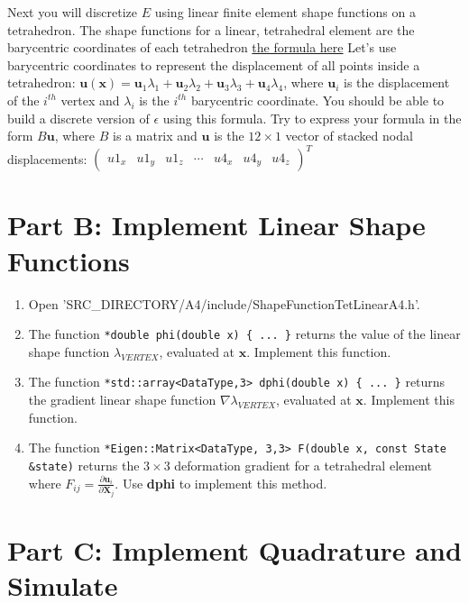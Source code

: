 \documentclass[11pt]{article}
\begin{document}
Next you will discretize $E$ using linear finite element shape functions on a tetrahedron. The shape functions for a linear, tetrahedral element are the barycentric coordinates of each tetrahedron \href{https://en.wikipedia.org/wiki/Barycentric_coordinate_system}{the formula here} Let's use barycentric coordinates to represent the displacement of all points inside a tetrahedron: $\mathbf{u(\mathbf{x})} = \mathbf{u}_1\lambda_1 +\mathbf{u}_2\lambda_2+\mathbf{u}_3\lambda_3+\mathbf{u}_4\lambda_4$, where $\mathbf{u}_i$ is the displacement of the $i^{th}$ vertex and $\lambda_i$ is the $i^{th}$ barycentric coordinate. You should be able to build a discrete version of $\epsilon$ using this formula. Try to express your formula in the form $B\mathbf{u}$, where $B$ is a matrix and $\mathbf{u}$ is the $12\times 1$ vector of stacked nodal displacements: $\begin{pmatrix} u1_x & u1_y &  u1_z & \cdots & u4_x & u4_y & u4_z \end{pmatrix}^T$


\section*{Part B: Implement Linear Shape Functions}

\begin{enumerate}
    \item Open '{SRC\_DIRECTORY}/A4/include/ShapeFunctionTetLinearA4.h'.
    \item  The function \texttt{*double phi(double x) \{ ... \}} returns the value of the linear shape function
    $\lambda_{VERTEX}$, evaluated at $\mathbf{x}$. Implement this function.
    \item The function \texttt{*std::array<DataType,3> dphi(double x) \{ ... \}} returns the gradient linear shape function
    $\nabla\lambda_{VERTEX}$, evaluated at $\mathbf{x}$. Implement this function.
    \item The function \texttt{*Eigen::Matrix<DataType, 3,3> F(double x, const State \&state)} returns the $3\times3$
    deformation gradient for a tetrahedral element where $F_{ij}=\frac{\partial \mathbf{u}_i}{\partial \mathbf{X}_j}$. Use \textbf{dphi} to implement this method.
\end{enumerate}

\section*{Part C: Implement Quadrature and Simulate}
\end{document}
